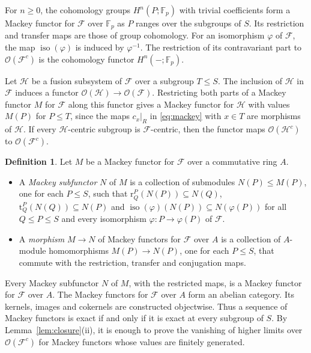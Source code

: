 \documentclass[10pt]{amsart}
\theoremstyle{definition}
\newtheorem{definition}[theorem]{Definition}
\numberwithin{equation}{section}
\renewcommand{\le}{\leqslant}
\renewcommand{\ge}{\geqslant}
\newcommand{\F}{\mathcal F}
\newcommand{\Hh}{\mathcal H}
\newcommand{\Op}{\mathcal O}
\begin{document}
For $n\ge0$, the cohomology groups $H^n(P;\mathbb{F}_p)$ with trivial coefficients form a Mackey functor for $\F$ over $\mathbb{F}_p$ as $P$ ranges over the subgroups of $S$. Its restriction and transfer maps are those of group cohomology. For an isomorphism $\varphi$ of $\F$, the map $\operatorname{iso}(\varphi)$ is induced by $\varphi^{-1}$. The restriction of its contravariant part to $\Op(\F^c)$ is the cohomology functor $H^n(-;\mathbb{F}_p)$.

Let $\Hh$ be a fusion subsystem of $\F$ over a subgroup $T\le S$. The inclusion of $\Hh$ in $\F$ induces a functor $\Op(\Hh)\to\Op(\F)$. Restricting both parts of a Mackey functor $M$ for $\F$ along this functor gives a Mackey functor for $\Hh$ with values $M(P)$ for $P\le T$, since the maps $c_x|_R$ in \eqref{eq:mackey} with $x\in T$ are morphisms of $\Hh$. If every $\Hh$-centric subgroup is $\F$-centric, then the functor maps $\Op(\Hh^c)$ to $\Op(\F^c)$.

\begin{definition}
Let $M$ be a Mackey functor for $\F$ over a commutative ring $A$.
\begin{itemize}
\item A \emph{Mackey subfunctor} $N$ of $M$ is a collection of submodules $N(P)\le M(P)$, one for each ${P\le S}$, such that $\mathrm{r}^P_Q(N(P))\subseteq N(Q)$, $\mathrm{t}^P_Q(N(Q))\subseteq N(P)$ and $\operatorname{iso}(\varphi)(N(P))\subseteq N(\varphi(P))$ for all ${Q\le P\le S}$ and every isomorphism $\varphi\colon P\to\varphi(P)$ of $\F$.
\item A \emph{morphism} $M\to N$ of Mackey functors for $\F$ over $A$ is a collection of $A$-module homomorphisms $M(P)\to N(P)$, one for each ${P\le S}$, that commute with the restriction, transfer and conjugation maps.
\end{itemize}
\end{definition}

Every Mackey subfunctor $N$ of $M$, with the restricted maps, is a Mackey functor for $\F$ over $A$. The Mackey functors for $\F$ over $A$ form an abelian category. Its kernels, images and cokernels are constructed objectwise. Thus a sequence of Mackey functors is exact if and only if it is exact at every subgroup of $S$. By Lemma~\ref{lem:closure}(ii), it is enough to prove the vanishing of higher limits over $\Op(\F^c)$ for Mackey functors whose values are finitely generated.
\end{document}
